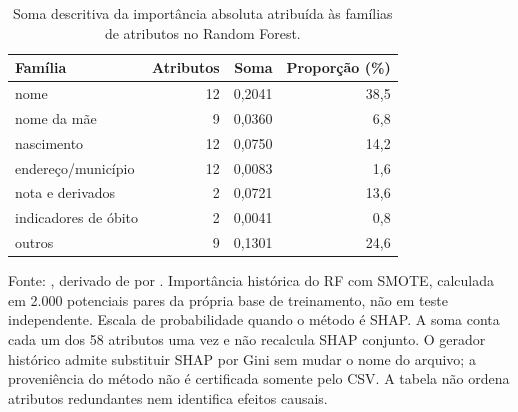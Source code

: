 \begin{table}[htbp]
\centering
\caption{Soma descritiva da importância absoluta atribuída às famílias de atributos no Random Forest.}
\label{tab:shap-importance}
\begin{tabular}{lrrr}
\toprule
Família & Atributos & Soma & Proporção (\%) \\
\midrule
nome & 12 & 0,2041 & 38,5 \\
nome da mãe & 9 & 0,0360 & 6,8 \\
nascimento & 12 & 0,0750 & 14,2 \\
endereço/município & 12 & 0,0083 & 1,6 \\
nota e derivados & 2 & 0,0721 & 13,6 \\
indicadores de óbito & 2 & 0,0041 & 0,8 \\
outros & 9 & 0,1301 & 24,6 \\
\bottomrule
\end{tabular}
\par\footnotesize Fonte: , derivado de  por . Importância histórica do RF com SMOTE, calculada em 2.000 potenciais pares da própria base de treinamento, não em teste independente. Escala de probabilidade quando o método é SHAP. A soma conta cada um dos 58 atributos uma vez e não recalcula SHAP conjunto. O gerador histórico admite substituir SHAP por Gini sem mudar o nome do arquivo; a proveniência do método não é certificada somente pelo CSV. A tabela não ordena atributos redundantes nem identifica efeitos causais.
\end{table}
